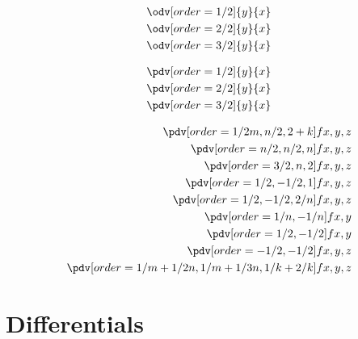 \begin{align}
	\odv[order=1/2]{y}{x} \\
	\odv[order=2/2]{y}{x} \\
	\odv[order=3/2]{y}{x}
\end{align}

\begin{align}
	\pdv[order=1/2]{y}{x} \\
	\pdv[order=2/2]{y}{x} \\
	\pdv[order=3/2]{y}{x}
\end{align}

\begin{align}
	\pdv[order={1/2m,n/2,2+k}]{f}{x,y,z} \\
	\pdv[order={n/2,n/2,n}]{f}{x,y,z} \\
	\pdv[order={3/2,n,2}]{f}{x,y,z} \\
	\pdv[order={1/2,-1/2,1}]{f}{x,y,z} \\
	\pdv[order={1/2,-1/2,2/n}]{f}{x,y,z} \\
	\pdv[order={1/n,-1/n}]{f}{x,y} \\
	\pdv[order={1/2,-1/2}]{f}{x,y} \\
	\pdv[order={-1/2,-1/2}]{f}{x,y,z} \\
	\pdv[order={1/m+1/2n,1/m+1/3n,1/k+2/k}]{f}{x,y,z} \\
\end{align}

	
	\clearpage
	\section{Differentials}

